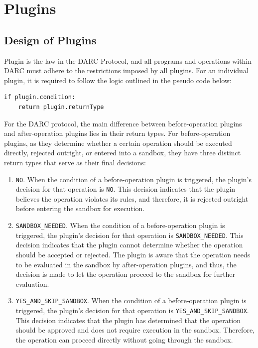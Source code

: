 \documentclass[main.tex]{subfiles}
\begin{document}
\section{Plugins}

\subsection{Design of Plugins}

Plugin is the law in the DARC Protocol, and all programs and operations within DARC must adhere to the restrictions imposed by all plugins. For an individual plugin, it is required to follow the logic outlined in the pseudo code below:

\begin{verbatim}
if plugin.condition:
    return plugin.returnType
\end{verbatim}

For the DARC protocol, the main difference between before-operation plugins and after-operation plugins lies in their return types. For before-operation plugins, as they determine whether a certain operation should be executed directly, rejected outright, or entered into a sandbox, they have three distinct return types that serve as their final decisions:

\begin{enumerate}
    \item \texttt{NO}. When the condition of a before-operation plugin is triggered, the plugin's decision for that operation is \texttt{NO}. This decision indicates that the plugin believes the operation violates its rules, and therefore, it is rejected outright before entering the sandbox for execution.

    \item \texttt{SANDBOX\_NEEDED}.   When the condition of a before-operation plugin is triggered, the plugin's decision for that operation is \texttt{SANDBOX\_NEEDED}. This decision indicates that the plugin cannot determine whether the operation should be accepted or rejected. The plugin is aware that the operation needs to be evaluated in the sandbox by after-operation plugins, and thus, the decision is made to let the operation proceed to the sandbox for further evaluation.

    \item \texttt{YES\_AND\_SKIP\_SANDBOX}. When the condition of a before-operation plugin is triggered, the plugin's decision for that operation is \texttt{YES\_AND\_SKIP\_SANDBOX}. This decision indicates that the plugin has determined that the operation should be approved and does not require execution in the sandbox. Therefore, the operation can proceed directly without going through the sandbox.
\end{enumerate}
\end{document}
